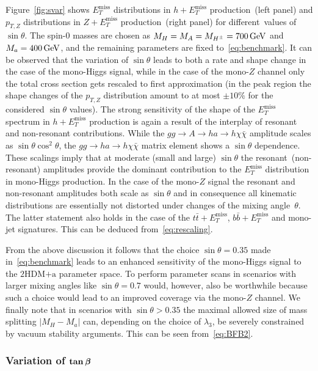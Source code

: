 \documentclass[a4paper, 11pt,notoc]{article}
\newcommand{\MET}{\ensuremath{E_T^\mathrm{miss}}\xspace}
\newcommand{\mA}{\ensuremath{M_{A}}\xspace}
\newcommand{\ma}{\ensuremath{M_{a}}\xspace}
\newcommand{\mH}{\ensuremath{M_{H}}\xspace}
\newcommand{\mHc}{\ensuremath{M_{H^{\pm}}}\xspace}
\newcommand{\hdma}{\ensuremath{\textrm{2HDM+a}}\xspace}
\def\bm#1{\mbox{\boldmath$#1$\unboldmath}}
\begin{document}
Figure~\ref{fig:svar} shows $\MET$ distributions in $h + \MET$ production~(left panel) and $p_{T,Z}$ distributions in $Z+\MET$ production~(right panel) for different~values of $\sin \theta$. The spin-0 masses are chosen as $\mH = \mA = \mHc = 700 \, {\rm GeV}$ and $\ma = 400 \, {\rm GeV}$, and the remaining parameters are fixed to~\eqref{eq:benchmark}. It can be observed that the variation of $\sin \theta$ leads to both a rate and shape change in the case of the mono-Higgs signal, while in the case of the mono-$Z$ channel only the total cross section gets rescaled to first approximation (in the peak region the shape changes of the $p_{T,Z}$ distribution amount to at most $\pm 10\%$ for the considered $\sin \theta$ values). The strong sensitivity of the shape of the $\MET$ spectrum in $h + \MET$ production is again a result of the interplay of resonant and non-resonant contributions. While the $gg \to A \to h a \to h \chi \bar \chi$  amplitude scales as $\sin \theta \cos^2 \theta$, the $gg \to h a  \to h \chi \bar \chi$ matrix element shows a $\sin \theta$ dependence. These scalings imply that at moderate  (small and large) $\sin \theta$ the resonant~(non-resonant) amplitudes provide the dominant contribution to the $\MET$ distribution in mono-Higgs production.  In the case of the mono-$Z$ signal the resonant and non-resonant amplitudes both scale as $\sin \theta$ and in consequence  all kinematic distributions are essentially not distorted  under changes of the mixing angle~$\theta$. The latter statement also holds in the case of the $t \bar t +\MET$, $b \bar b + \MET$ and mono-jet signatures.  This can be deduced from~\eqref{eq:rescaling}.

From the above discussion it follows that the choice $\sin \theta = 0.35$ made in~\eqref{eq:benchmark} leads to an enhanced sensitivity of the mono-Higgs signal to the \hdma parameter space. To perform parameter scans in scenarios with larger mixing angles like $\sin \theta = 0.7$ would, however, also be worthwhile because such a choice would lead to an improved coverage via the mono-$Z$ channel. We finally note that in scenarios with $\sin \theta >0.35$ the maximal allowed size of mass splitting $|M_H - M_a|$ can, depending on the choice of $\lambda_3$, be severely constrained by vacuum stability arguments. This can be seen from~\eqref{eq:BFB2}. 

\subsubsection[Variation of $\tan \beta$]{Variation of $\bm{\tan \beta}$}
\label{sec:variationtanb}
\end{document}
